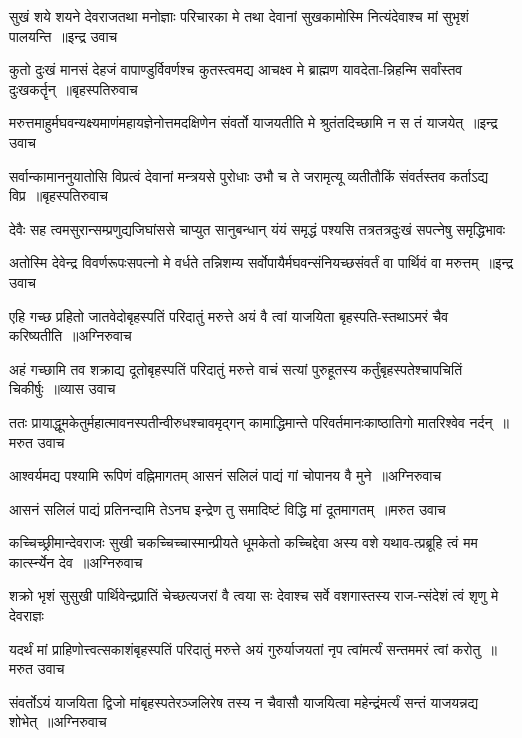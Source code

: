 \threelineshloka
{सुखं शये शयने देवराजतथा मनोज्ञाः परिचारका मे}
{तथा देवानां सुखकामोस्मि नित्यंदेवाश्च मां सुभृशं पालयन्ति ॥इन्द्र उवाच}
{}


\threelineshloka
{कुतो दुःखं मानसं देहजं वापाण्डुर्विवर्णश्च कुतस्त्वमद्य}
{आचक्ष्व मे ब्राह्मण यावदेता-न्निहन्मि सर्वांस्तव दुःखकर्तॄन् ॥बृहस्पतिरुवाच}
{}


\threelineshloka
{मरुत्तमाहुर्मघवन्यक्ष्यमाणंमहायज्ञेनोत्तमदक्षिणेन}
{संवर्तो याजयतीति मे श्रुतंतदिच्छामि न स तं याजयेत् ॥इन्द्र उवाच}
{}


\threelineshloka
{सर्वान्कामाननुयातोसि विप्रत्वं देवानां मन्त्रयसे पुरोधाः}
{उभौ च ते जरामृत्यू व्यतीतौकिं संवर्तस्तव कर्ताऽद्य विप्र ॥बृहस्पतिरुवाच}
{}


\twolineshloka
{देवैः सह त्वमसुरान्सम्प्रणुद्यजिघांससे चाप्युत सानुबन्धान्}
{यंयं समृद्धं पश्यसि तत्रतत्रदुःखं सपत्नेषु समृद्धिभावः}


\threelineshloka
{अतोस्मि देवेन्द्र विवर्णरूपःसपत्नो मे वर्धते तन्निशम्य}
{सर्वोपायैर्मघवन्संनियच्छसंवर्तं वा पार्थिवं वा मरुत्तम् ॥इन्द्र उवाच}
{}


\threelineshloka
{एहि गच्छ प्रहितो जातवेदोबृहस्पतिं परिदातुं मरुत्ते}
{अयं वै त्वां याजयिता बृहस्पति-स्तथाऽमरं चैव करिष्यतीति ॥अग्निरुवाच}
{}


\threelineshloka
{अहं गच्छामि तव शक्राद्य दूतोबृहस्पतिं परिदातुं मरुत्ते}
{वाचं सत्यां पुरुहूतस्य कर्तुंबृहस्पतेश्चापचितिं चिकीर्षुः ॥व्यास उवाच}
{}


\threelineshloka
{ततः प्रायाद्धूमकेतुर्महात्मावनस्पतीन्वीरुधश्चावमृद्गन्}
{कामाद्धिमान्ते परिवर्तमानःकाष्ठातिगो मातरिश्वेव नर्दन् ॥मरुत उवाच}
{}


\threelineshloka
{आश्वर्यमद्य पश्यामि रूपिणं वह्निमागतम्}
{आसनं सलिलं पाद्यं गां चोपानय वै मुने ॥अग्निरुवाच}
{}


\threelineshloka
{आसनं सलिलं पाद्यं प्रतिनन्दामि तेऽनघ}
{इन्द्रेण तु समादिष्टं विद्धि मां दूतमागतम् ॥मरुत उवाच}
{}


\threelineshloka
{कच्चिच्छ्रीमान्देवराजः सुखी चकच्चिच्चास्मान्प्रीयते धूमकेतो}
{कच्चिद्देवा अस्य वशे यथाव-त्प्रब्रूहि त्वं मम कार्त्स्न्येन देव ॥अग्निरुवाच}
{}


\twolineshloka
{शक्रो भृशं सुसुखी पार्थिवेन्द्रप्रातिं चेच्छत्यजरां वै त्वया सः}
{देवाश्च सर्वे वशगास्तस्य राज-न्संदेशं त्वं शृणु मे देवराज्ञः}


\threelineshloka
{यदर्थं मां प्राहिणोत्त्वत्सकाशंबृहस्पतिं परिदातुं मरुत्ते}
{अयं गुरुर्याजयतां नृप त्वांमर्त्यं सन्तममरं त्वां करोतु ॥मरुत उवाच}
{}


\threelineshloka
{संवर्तोऽयं याजयिता द्विजो मांबृहस्पतेरञ्जलिरेष तस्य}
{न चैवासौ याजयित्वा महेन्द्रंमर्त्यं सन्तं याजयन्नद्य शोभेत् ॥अग्निरुवाच}
{}


